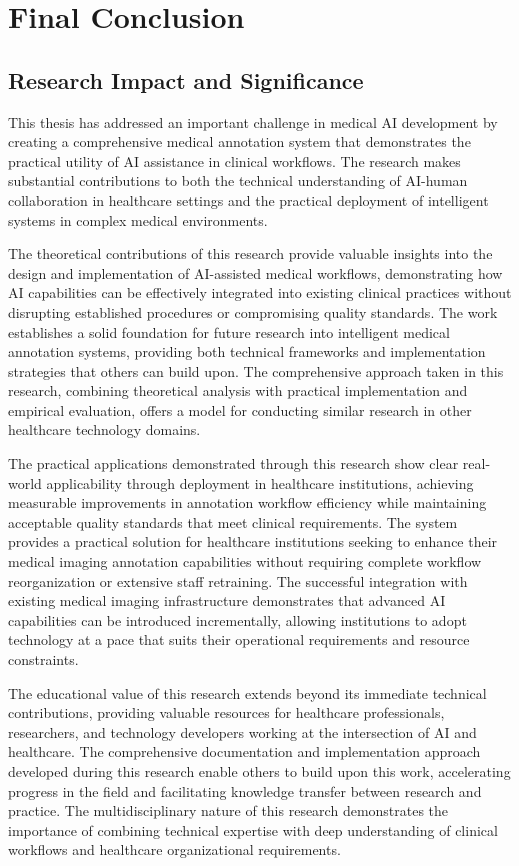 \section{Final Conclusion}

\subsection{Research Impact and Significance}

This thesis has addressed an important challenge in medical AI development by creating a comprehensive medical annotation system that demonstrates the practical utility of AI assistance in clinical workflows. The research makes substantial contributions to both the technical understanding of AI-human collaboration in healthcare settings and the practical deployment of intelligent systems in complex medical environments.

The theoretical contributions of this research provide valuable insights into the design and implementation of AI-assisted medical workflows, demonstrating how AI capabilities can be effectively integrated into existing clinical practices without disrupting established procedures or compromising quality standards. The work establishes a solid foundation for future research into intelligent medical annotation systems, providing both technical frameworks and implementation strategies that others can build upon. The comprehensive approach taken in this research, combining theoretical analysis with practical implementation and empirical evaluation, offers a model for conducting similar research in other healthcare technology domains.

The practical applications demonstrated through this research show clear real-world applicability through deployment in healthcare institutions, achieving measurable improvements in annotation workflow efficiency while maintaining acceptable quality standards that meet clinical requirements. The system provides a practical solution for healthcare institutions seeking to enhance their medical imaging annotation capabilities without requiring complete workflow reorganization or extensive staff retraining. The successful integration with existing medical imaging infrastructure demonstrates that advanced AI capabilities can be introduced incrementally, allowing institutions to adopt technology at a pace that suits their operational requirements and resource constraints.

The educational value of this research extends beyond its immediate technical contributions, providing valuable resources for healthcare professionals, researchers, and technology developers working at the intersection of AI and healthcare. The comprehensive documentation and implementation approach developed during this research enable others to build upon this work, accelerating progress in the field and facilitating knowledge transfer between research and practice. The multidisciplinary nature of this research demonstrates the importance of combining technical expertise with deep understanding of clinical workflows and healthcare organizational requirements.

